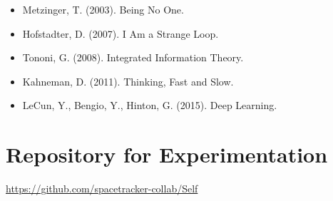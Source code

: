 \documentclass[12pt]{article}
\begin{document}
\begin{itemize}
\item Metzinger, T. (2003). Being No One.
\item Hofstadter, D. (2007). I Am a Strange Loop.
\item Tononi, G. (2008). Integrated Information Theory.
\item Kahneman, D. (2011). Thinking, Fast and Slow.
\item LeCun, Y., Bengio, Y., Hinton, G. (2015). Deep Learning.
\end{itemize}

\section{Repository for Experimentation}

\noindent
\url{https://github.com/spacetracker-collab/Self}
\end{document}
